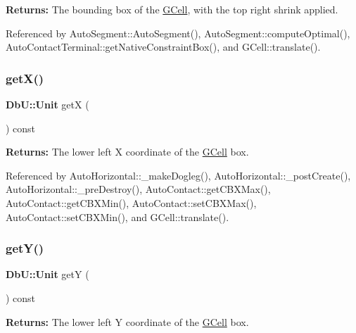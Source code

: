 {\bfseries Returns\+:} The bounding box of the \hyperlink{classKatabatic_1_1GCell}{G\+Cell}, with the top right shrink applied. 

Referenced by Auto\+Segment\+::\+Auto\+Segment(), Auto\+Segment\+::compute\+Optimal(), Auto\+Contact\+Terminal\+::get\+Native\+Constraint\+Box(), and G\+Cell\+::translate().

\mbox{\label{classKatabatic_1_1GCell_a00b8f54c8171f6699e57de1b8c18eeb1}} 
\subsubsection{\texorpdfstring{get\+X()}{getX()}}
{\footnotesize\ttfamily \textbf{ Db\+U\+::\+Unit} getX (\begin{DoxyParamCaption}{ }\end{DoxyParamCaption}) const\hspace{0.3cm}{\ttfamily [inline]}}

{\bfseries Returns\+:} The lower left X coordinate of the \hyperlink{classKatabatic_1_1GCell}{G\+Cell} box. 

Referenced by Auto\+Horizontal\+::\+\_\+make\+Dogleg(), Auto\+Horizontal\+::\+\_\+post\+Create(), Auto\+Horizontal\+::\+\_\+pre\+Destroy(), Auto\+Contact\+::get\+C\+B\+X\+Max(), Auto\+Contact\+::get\+C\+B\+X\+Min(), Auto\+Contact\+::set\+C\+B\+X\+Max(), Auto\+Contact\+::set\+C\+B\+X\+Min(), and G\+Cell\+::translate().

\mbox{\label{classKatabatic_1_1GCell_a4580de6b074712e400d5d238ce3af054}} 
\subsubsection{\texorpdfstring{get\+Y()}{getY()}}
{\footnotesize\ttfamily \textbf{ Db\+U\+::\+Unit} getY (\begin{DoxyParamCaption}{ }\end{DoxyParamCaption}) const\hspace{0.3cm}{\ttfamily [inline]}}

{\bfseries Returns\+:} The lower left Y coordinate of the \hyperlink{classKatabatic_1_1GCell}{G\+Cell} box. 

